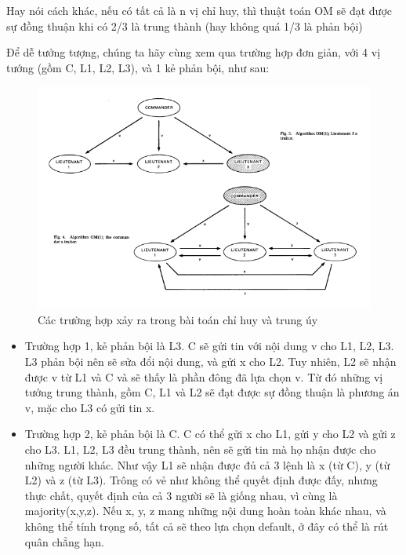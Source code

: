 \documentclass[14pt, a4paper]{article}
\numberwithin{equation}{section}
\numberwithin{figure}{section}
\numberwithin{dl}{section}
\numberwithin{md}{section}
\numberwithin{bd}{section}
\numberwithin{dn}{section}
\numberwithin{hq}{section}
\begin{document}
\begin{enumerate}
        Hay nói cách khác, nếu có tất cả là n vị chỉ huy, thì thuật toán OM sẽ đạt được sự đồng thuận khi có 2/3 là trung thành (hay không quá 1/3 là phản bội)

        Để dễ tưởng tượng, chúng ta hãy cùng xem qua trường hợp đơn giản, với 4 vị tướng (gồm C, L1, L2, L3), và 1 kẻ phản bội, như sau:

        \begin{figure}[h!]
            \centering
            \includegraphics{commander_leutenants.png}
            \caption{Các trường hợp xảy ra trong bài toán chỉ huy và trung úy}
        \end{figure}
        \begin{itemize}
            \item Trường hợp 1, kẻ phản bội là L3. C sẽ gửi tin với nội dung v cho L1, L2, L3. L3 phản bội nên sẽ sửa đổi nội dung, và gửi x cho L2. Tuy nhiên, L2 sẽ nhận được v từ L1 và C và sẽ thấy là phần đông đã lựa chọn v. Từ đó những vị tướng trung thành, gồm C, L1 và L2 sẽ đạt được sự đồng thuận là phương án v, mặc cho L3 có gửi tin x.
            \item Trường hợp 2, kẻ phản bội là C. C có thể gửi x cho L1, gửi y cho L2 và gửi z cho L3. L1, L2, L3 đều trung thành, nên sẽ gửi tin mà họ nhận được cho những người khác. Như vậy L1 sẽ nhận được đủ cả 3 lệnh là x (từ C), y (từ L2) và z (từ L3). Trông có vẻ như không thể quyết định được đấy, nhưng thực chất, quyết định của cả 3 người sẽ là giống nhau, vì cùng là majority(x,y,z). Nếu x, y, z mang những nội dung hoàn toàn khác nhau, và không thể tính trọng số, tất cả sẽ theo lựa chọn default, ở đây có thể là rút quân chẳng hạn.
        \end{itemize}
    \end{enumerate}
\end{document}

